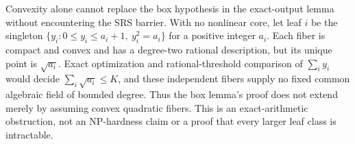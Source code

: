 \begin{remark}
\label{rem:a-blk-convex-barrier}
Convexity alone cannot replace the box hypothesis in the exact-output
lemma without encountering the SRS barrier. With no nonlinear core,
let leaf $i$ be the singleton
$\{y_i:0\le y_i\le a_i+1,\ y_i^2=a_i\}$ for a positive integer $a_i$.
Each fiber is compact and convex and has a degree-two rational
description, but its unique point is $\sqrt{a_i}$. Exact optimization
and rational-threshold comparison of $\sum_i y_i$ would decide
$\sum_i\sqrt{a_i}\le K$, and these independent fibers supply no fixed
common algebraic field of bounded degree. Thus the box lemma's proof
does not extend merely by assuming convex quadratic fibers. This is an
exact-arithmetic obstruction, not an NP-hardness claim or a proof that
every larger leaf class is intractable.
\end{remark}
